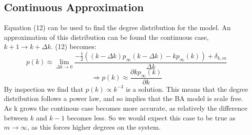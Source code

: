 \documentclass[]{article}
\begin{document}
\subsection{Continuous Approximation}
Equation (12) can be used to find the degree distribution for the model.
An approximation of this distribution can be found the continuous case,$k+1 \rightarrow k + \Delta k$. (12) becomes:
\begin{equation}
{p(k) \approx \lim\limits_{\Delta k \rightarrow 0}\frac{-\frac{1}{2}((k-\Delta k )p_{\infty}(k-\Delta k)-kp_{\infty}(k)) +\delta_{k,m}}{\Delta k} }
\end{equation}
\begin{equation}
\Rightarrow p(k)\approx \frac{\partial kp_{\infty}(k)}{\partial k}
\end{equation}
By inspection we find that $p(k) \propto k^{-3}$ is a solution. This means that the degree distribution follows a power law, and so implies that the BA model is scale free. \\
As k grows the continous case becomes more accurate, as relatively the difference between $k$ and $k-1$ becomes less. So we would expect this case to be true as $m\rightarrow \infty$, as this forces higher degrees on the system. 
\end{document}
